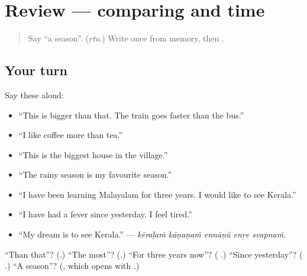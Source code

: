 \section[(review)]{Review — comparing and time}

\label{lesson:ML-R346-comparing-and-time}



\begin{quote}
Say \textquotedblleft{}a season\textquotedblright{}. (\emph{ṛtu}.) Write \textbf{} once from memory, then \textbf{}.
\end{quote}

\subsection*{Your turn}
Say these aloud:

\begin{itemize}
\raggedright
  \item \textquotedblleft{}This is bigger than that. The train goes faster than the bus.\textquotedblright{}
  \item \textquotedblleft{}I like coffee more than tea.\textquotedblright{}
  \item \textquotedblleft{}This is the biggest house in the village.\textquotedblright{}
  \item \textquotedblleft{}The rainy season is my favourite season.\textquotedblright{}
  \item \textquotedblleft{}I have been learning Malayalam for three years. I would like to see Kerala.\textquotedblright{}
  \item \textquotedblleft{}I have had a fever since yesterday. I feel tired.\textquotedblright{}
  \item \textquotedblleft{}My dream is to see Kerala.\textquotedblright{} — \emph{kēraḷaṁ kāṇaṇaṁ ennāṇŭ enṟe svapnaṁ.}
\end{itemize}

\begin{tcolorbox}[breakable,colback=teal!4,colframe=teal!35!black,title={Before you move on}]
\textquotedblleft{}Than that\textquotedblright{}? (\textbf{}.) \textquotedblleft{}The most\textquotedblright{}? (\textbf{}.) \textquotedblleft{}For three years now\textquotedblright{}? (\textbf{ }.) \textquotedblleft{}Since yesterday\textquotedblright{}? (\textbf{ }.) \textquotedblleft{}A season\textquotedblright{}? (\textbf{}, which opens with \textbf{}.)
\end{tcolorbox}
